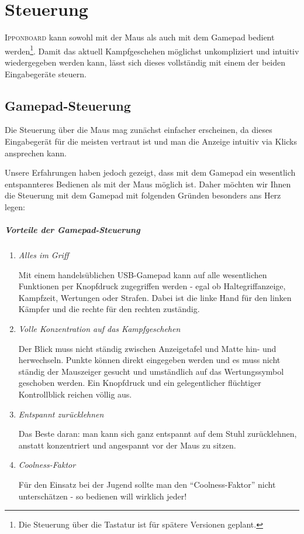 ﻿\documentclass[11pt,numbers=noenddot]{scrreprt}
\newcommand*{\IB}{\begingroup{\fontspec{Cuprum}\selectfont\textsc{Ipponboard}} \endgroup}
\begin{document}
\chapter{Steuerung}

{\IB} kann sowohl mit der Maus als auch mit dem Gamepad bedient werden\footnote{Die Steuerung über die Tastatur ist für spätere Versionen geplant.}. Damit das aktuell Kampfgeschehen möglichst unkompliziert und intuitiv wiedergegeben werden kann, lässt sich dieses vollständig mit einem der beiden Eingabegeräte steuern.

\section{Gamepad-Steuerung}
Die Steuerung über die Maus mag zunächst einfacher erscheinen, da dieses Eingabegerät für die meisten vertraut ist und man die Anzeige intuitiv via Klicks ansprechen kann.

Unsere Erfahrungen haben jedoch gezeigt, dass mit dem Gamepad ein wesentlich entspannteres Bedienen als mit der Maus möglich ist. Daher möchten wir Ihnen die Steuerung mit dem Gamepad mit folgenden Gründen besonders ans Herz legen:

\paragraph*{Vorteile der Gamepad-Steuerung}
\begin{enumerate}
	\item \textit{Alles im Griff}

	Mit einem handelsüblichen USB-Gamepad kann auf alle wesentlichen Funktionen per Knopfdruck zugegriffen werden \-- egal ob Haltegriffanzeige, Kampfzeit, Wertungen oder Strafen. Dabei ist die linke Hand für den linken Kämpfer und die rechte für den rechten zuständig.

	\item \textit{Volle Konzentration auf das Kampfgeschehen}
	
	Der Blick muss nicht ständig zwischen Anzeigetafel und Matte hin- und herwechseln. Punkte können direkt eingegeben werden und es muss nicht ständig der Mauszeiger gesucht und umständlich auf das Wertungssymbol geschoben werden. Ein Knopfdruck und ein gelegentlicher flüchtiger Kontrollblick reichen völlig aus.
	
	\item \textit{Entspannt zurücklehnen}
	
	Das Beste daran: man kann sich ganz entspannt auf dem Stuhl zurücklehnen, anstatt konzentriert und angespannt vor der Maus zu sitzen.

	\item \textit{Coolness-Faktor}
	
	Für den Einsatz bei der Jugend sollte man den "`Coolness-Faktor"' nicht unterschätzen \-- so bedienen will wirklich jeder!
\end{enumerate}
\end{document}
